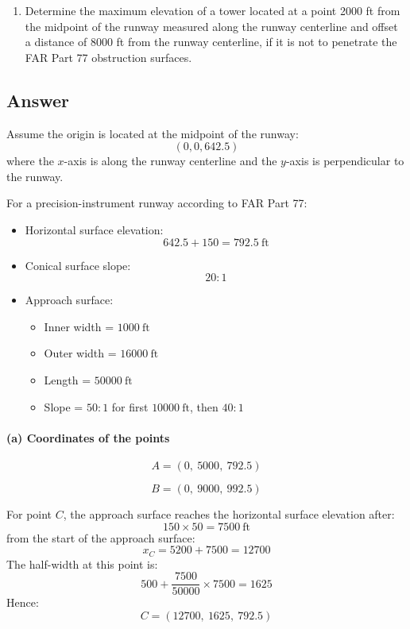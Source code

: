 \documentclass{KPS_assignment}
\begin{document}
\begin{enumerate}
\begin{enumerate}
    \item[(c)] Determine the maximum elevation of a tower located at a point 2000 ft from the midpoint of the runway measured along the runway centerline and offset a distance of 8000 ft from the runway centerline, if it is not to penetrate the FAR Part 77 obstruction surfaces.
\end{enumerate}

\subsection*{Answer}

Assume the origin is located at the midpoint of the runway:
\[
(0,0,642.5)
\]
where the \(x\)-axis is along the runway centerline and the \(y\)-axis is perpendicular to the runway.

For a precision-instrument runway according to FAR Part 77:

\begin{itemize}
    \item Horizontal surface elevation:
    \[
    642.5 + 150 = 792.5\ \text{ft}
    \]
    
    \item Conical surface slope:
    \[
    20:1
    \]
    
    \item Approach surface:
    \begin{itemize}
        \item Inner width = \(1000\ \text{ft}\)
        \item Outer width = \(16000\ \text{ft}\)
        \item Length = \(50000\ \text{ft}\)
        \item Slope = \(50:1\) for first \(10000\ \text{ft}\), then \(40:1\)
    \end{itemize}
\end{itemize}

\paragraph{(a) Coordinates of the points}

\[
A=(0,\ 5000,\ 792.5)
\]

\[
B=(0,\ 9000,\ 992.5)
\]

For point \(C\), the approach surface reaches the horizontal surface elevation after:
\[
150 \times 50 = 7500\ \text{ft}
\]
from the start of the approach surface:
\[
x_C = 5200 + 7500 = 12700
\]
The half-width at this point is:
\[
500 + \frac{7500}{50000}\times7500 = 1625
\]
Hence:
\[
C=(12700,\ 1625,\ 792.5)
\]


\end{enumerate}
\end{document}
